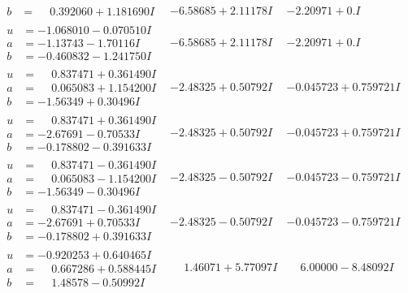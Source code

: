 \documentclass[1p]{elsarticle_modified}
\theoremstyle{definition}
\begin{document}
$$\begin{array}{c|c|c}
\begin{aligned}
b &= \phantom{-}0.392060 + 1.181690 I\end{aligned}
 & -6.58685 + 2.11178 I & -2.20971 + 0. I\phantom{ +0.000000I} \\ \hline\begin{aligned}
u &= -1.068010 - 0.070510 I \\
a &= -1.13743 - 1.70116 I \\
b &= -0.460832 - 1.241750 I\end{aligned}
 & -6.58685 + 2.11178 I & -2.20971 + 0. I\phantom{ +0.000000I} \\ \hline\begin{aligned}
u &= \phantom{-}0.837471 + 0.361490 I \\
a &= \phantom{-}0.065083 + 1.154200 I \\
b &= -1.56349 + 0.30496 I\end{aligned}
 & -2.48325 + 0.50792 I & -0.045723 + 0.759721 I \\ \hline\begin{aligned}
u &= \phantom{-}0.837471 + 0.361490 I \\
a &= -2.67691 - 0.70533 I \\
b &= -0.178802 - 0.391633 I\end{aligned}
 & -2.48325 + 0.50792 I & -0.045723 + 0.759721 I \\ \hline\begin{aligned}
u &= \phantom{-}0.837471 - 0.361490 I \\
a &= \phantom{-}0.065083 - 1.154200 I \\
b &= -1.56349 - 0.30496 I\end{aligned}
 & -2.48325 - 0.50792 I & -0.045723 - 0.759721 I \\ \hline\begin{aligned}
u &= \phantom{-}0.837471 - 0.361490 I \\
a &= -2.67691 + 0.70533 I \\
b &= -0.178802 + 0.391633 I\end{aligned}
 & -2.48325 - 0.50792 I & -0.045723 - 0.759721 I \\ \hline\begin{aligned}
u &= -0.920253 + 0.640465 I \\
a &= \phantom{-}0.667286 + 0.588445 I \\
b &= \phantom{-}1.48578 - 0.50992 I\end{aligned}
 & \phantom{-}1.46071 + 5.77097 I & \phantom{-}6.00000 - 8.48092 I \\ \hline\begin{aligned}

\end{aligned}
\end{array}$$
\end{document}
